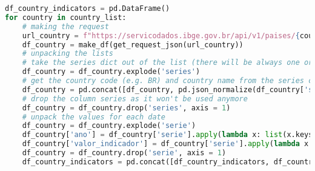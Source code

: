 \begin{apendicesenv}
\begin{lstlisting}[label={lst:api-paises},language=Python, caption=\textit{Script} de carga dos indicadores da API de países.]
df_country_indicators = pd.DataFrame()
for country in country_list:
    # making the request
    url_country = f"https://servicodados.ibge.gov.br/api/v1/paises/{country}/indicadores"
    df_country = make_df(get_request_json(url_country))
    # unpacking the lists
    # take the series dict out of the list (there will be always one or zero values on the list)
    df_country = df_country.explode('series')
    # get the country code (e.g. BR) and country name from the series country and concat it into each of the df_country lines
    df_country = pd.concat([df_country, pd.json_normalize(df_country['series'])], axis = 1)
    # drop the column series as it won't be used anymore
    df_country = df_country.drop('series', axis = 1)
    # unpack the values for each date
    df_country = df_country.explode('serie')
    df_country['ano'] = df_country['serie'].apply(lambda x: list(x.keys())[0] if type(x) == dict else None)
    df_country['valor_indicador'] = df_country['serie'].apply(lambda x: list(x.values())[0] if type(x) == dict else None)
    df_country = df_country.drop('serie', axis = 1)
    df_country_indicators = pd.concat([df_country_indicators, df_country], ignore_index=True)
\end{lstlisting}

\newpage


\end{apendicesenv}